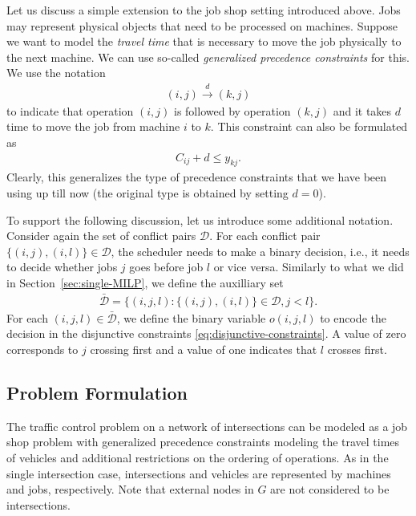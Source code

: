 \documentclass{article}
\theoremstyle{definition}
\theoremstyle{plain}
\begin{document}
Let us discuss a simple extension to the job shop setting introduced above.
Jobs may represent physical objects that need to be processed on machines.
Suppose we want to model the \textit{travel time} that is necessary to move the
job physically to the next machine. We can use so-called \textit{generalized
  precedence constraints} for this. We use the notation
\begin{align*}
  (i,j) \xrightarrow{d} (k,j)
\end{align*}
to indicate that operation $(i,j)$ is followed by operation $(k,j)$ and it takes
$d$ time to move the job from machine $i$ to $k$. This constraint can also be
formulated as
\begin{align}
  C_{ij} + d \leq y_{kj} .
\end{align}
Clearly, this generalizes the type of precedence constraints that we have been
using up till now (the original type is obtained by setting $d=0$).

To support the following discussion, let us introduce some additional notation.
Consider again the set of conflict pairs $\mathcal{D}$. For each conflict pair
$\{ (i,j), (i,l) \} \in \mathcal{D}$, the scheduler needs to make a binary
decision, i.e., it needs to decide whether jobs $j$ goes before job $l$ or vice
versa. Similarly to what we did in Section~\ref{sec:single-MILP}, we define the
auxilliary set
\begin{align}
  \bar{\mathcal{D}} = \{ (i,j,l) : \{ (i,j), (i,l) \} \in \mathcal{D}, j < l \} .
\end{align}
For each $(i,j,l) \in \bar{\mathcal{D}}$, we define the binary variable
$o(i,j,l)$ to encode the decision in the disjunctive constraints
\eqref{eq:disjunctive-constraints}. A value of zero corresponds to $j$ crossing
first and a value of one indicates that $l$ crosses first.


\subsection{Problem Formulation}

The traffic control problem on a network of intersections can be modeled as a
job shop problem with generalized precedence constraints modeling the travel
times of vehicles and additional restrictions on the ordering of operations. As
in the single intersection case, intersections and vehicles are represented by
machines and jobs, respectively. Note that external nodes in $G$ are not
considered to be intersections.
\end{document}
